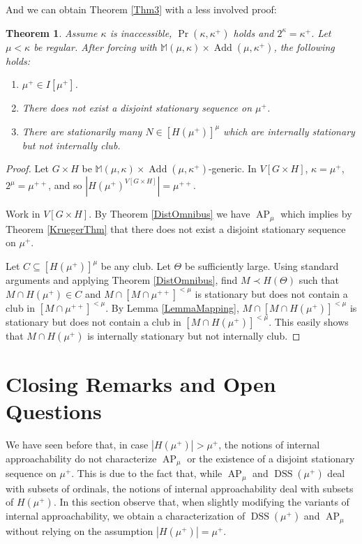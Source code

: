 \documentclass[a4paper]{amsart}
\theoremstyle{definition}
\theoremstyle{remark}
\theoremstyle{plain}
\newtheorem{mysen}[mydef]{Theorem}
\numberwithin{mydef}{section}
\DeclareMathOperator{\Add}{Add}
\DeclareMathOperator{\AP}{AP}
\DeclareMathOperator{\DSS}{DSS}
\newcommand{\dM}{\mathbb{M}}
\begin{document}
	And we can obtain Theorem \ref{Thm3} with a less involved proof:
	
	\begin{mysen}
		Assume $\kappa$ is inaccessible, $\Pr(\kappa,\kappa^+)$ holds and $2^{\kappa}=\kappa^+$. Let $\mu<\kappa$ be regular. After forcing with $\dM(\mu,\kappa)\times\Add(\mu,\kappa^+)$, the following holds:
		\begin{enumerate}
			\item $\mu^+\in I[\mu^+]$.
			\item There does not exist a disjoint stationary sequence on $\mu^+$.
			\item There are stationarily many $N\in[H(\mu^+)]^{\mu}$ which are internally stationary but not internally club.
		\end{enumerate}
	\end{mysen}
	
	\begin{proof}
		Let $G\times H$ be $\dM(\mu,\kappa)\times\Add(\mu,\kappa^+)$-generic. In $V[G\times H]$, $\kappa=\mu^+$, $2^{\mu}=\mu^{++}$, and so $|H(\mu^+)^{V[G\times H]}|=\mu^{++}$.
		
		Work in $V[G\times H]$. By Theorem \ref{DistOmnibus} we have $\AP_{\mu}$ which implies by Theorem \ref{KruegerThm} that there does not exist a disjoint stationary sequence on $\mu^+$.
		
		Let $C\subseteq[H(\mu^+)]^{\mu}$ be any club. Let $\Theta$ be sufficiently large. Using standard arguments and applying Theorem \ref{DistOmnibus}, find $M\prec H(\Theta)$ such that $M\cap H(\mu^+)\in C$ and $M\cap[M\cap\mu^{++}]^{<\mu}$ is stationary but does not contain a club in $[M\cap\mu^{++}]^{<\mu}$. By Lemma \ref{LemmaMapping}, $M\cap[M\cap H(\mu^+)]^{<\mu}$ is stationary but does not contain a club in $[M\cap H(\mu^+)]^{<\mu}$. This easily shows that $M\cap H(\mu^+)$ is internally stationary but not internally club.
	\end{proof}
	
	\section{Closing Remarks and Open Questions}
	
	We have seen before that, in case $|H(\mu^+)|>\mu^+$, the notions of internal approachability do not characterize $\AP_{\mu}$ or the existence of a disjoint stationary sequence on $\mu^+$. This is due to the fact that, while $\AP_{\mu}$ and $\DSS(\mu^+)$ deal with subsets of ordinals, the notions of internal approachability deal with subsets of $H(\mu^+)$. In this section observe that, when slightly modifying the variants of internal approachability, we obtain a characterization of $\DSS(\mu^+)$ and $\AP_{\mu}$ without relying on the assumption $|H(\mu^+)|=\mu^+$.
	
\end{document}
